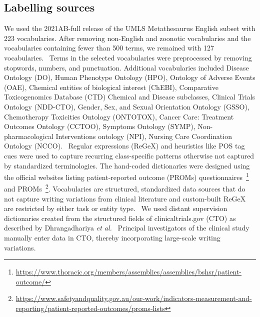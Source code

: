 \documentclass[10.7pt,]{article}
\begin{document}
\subsection{Labelling sources}\label{lss}
%
We used the 2021AB-full release of the UMLS Metathesaurus English subset with 223 vocabularies.
After removing non-English and zoonotic vocabularies and the vocabularies containing fewer than 500 terms, we remained with 127 vocabularies.~\cite{humphreys1998unified}
Terms in the selected vocabularies were preprocessed by removing stopwords, numbers, and punctuation.
Additional vocabularies included Disease Ontology (DO), Human Phenotype Ontology (HPO), Ontology of Adverse Events (OAE), Chemical entities of biological interest (ChEBI),  Comparative Toxicogenomics Database (CTD) Chemical and Disease subclasses, Clinical Trials Ontology (NDD-CTO), Gender, Sex, and Sexual Orientation Ontology (GSSO), Chemotherapy Toxicities Ontology (ONTOTOX), Cancer Care: Treatment Outcomes Ontology (CCTOO), Symptoms Ontology (SYMP), Non-pharmacological Interventions ontology (NPI), Nursing Care Coordination Ontology (NCCO).~\cite{schriml2012disease,robinson2008human,he2014oae,de2010chemical,lin2020cto,kronk2020development,geifman2011towards,rogier2021using,lin2018cancer,mohammed2012building,ninot2018definition}
Regular expressions (ReGeX) and heuristics like POS tag cues were used to capture recurring class-specific patterns otherwise not captured by standardized terminologies.
The hand-coded dictionaries were designed using the official websites listing patient-reported outcome (PROMs) questionnaires~\footnote{\url{https://www.thoracic.org/members/assemblies/assemblies/bshsr/patient-outcome/}} and PROMs~\footnote{\url{https://www.safetyandquality.gov.au/our-work/indicators-measurement-and-reporting/patient-reported-outcomes/proms-lists}}.
Vocabularies are structured, standardized data sources that do not capture writing variations from clinical literature and custom-built ReGeX are restricted by either task or entity type.~\cite{ratner2017snorkel,safranchik2020weakly}
We used distant supervision dictionaries created from the structured fields of clinicaltrials.gov (CTO) as described by Dhrangadhariya \textit{et al.}~\cite{dhrangadhariya2022distant}
Principal investigators of the clinical study manually enter data in CTO, thereby incorporating large-scale writing variations.~\cite{califf2012characteristics}
%
%
%
\end{document}
